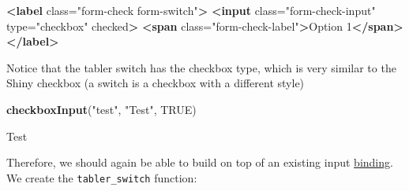 \documentclass[
]{book}
\newenvironment{Shaded}{\begin{snugshade}}{\end{snugshade}}
\newcommand{\KeywordTok}[1]{\textcolor[rgb]{0.13,0.29,0.53}{\textbf{#1}}}
\newcommand{\NormalTok}[1]{#1}
\newcommand{\OtherTok}[1]{\textcolor[rgb]{0.56,0.35,0.01}{#1}}
\newcommand{\StringTok}[1]{\textcolor[rgb]{0.31,0.60,0.02}{#1}}
\begin{document}
\begin{Shaded}
\begin{Highlighting}[]
\KeywordTok{<label}\OtherTok{ class=}\StringTok{"form-check form-switch"}\KeywordTok{>}
  \KeywordTok{<input}\OtherTok{ class=}\StringTok{"form-check-input"}\OtherTok{ type=}\StringTok{"checkbox"}\OtherTok{ checked}\KeywordTok{>}
  \KeywordTok{<span}\OtherTok{ class=}\StringTok{"form-check-label"}\KeywordTok{>}\NormalTok{Option 1}\KeywordTok{</span>}
\KeywordTok{</label>}
\end{Highlighting}
\end{Shaded}

Notice that the tabler switch has the checkbox type, which is very similar to the Shiny checkbox (a switch is a checkbox with a different style)

\begin{Shaded}
\begin{Highlighting}[]
\KeywordTok{checkboxInput}\NormalTok{(}\StringTok{"test"}\NormalTok{, }\StringTok{"Test"}\NormalTok{, }\OtherTok{TRUE}\NormalTok{)}
\end{Highlighting}
\end{Shaded}

{Test}

Therefore, we should again be able to build on top of an existing input \href{https://github.com/rstudio/shiny/blob/master/srcjs/input_binding_checkbox.js}{binding}. We create the \texttt{tabler\_switch} function:
\end{document}
